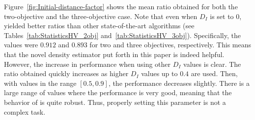 Figure~\ref{fig:Initial-distance-factor} shows the mean \HV{} ratio obtained for both the two-objective 
and the three-objective case.
%
Note that even when $D_I$ is set to $0$, \VSDMOEA{} yielded better \HV{} ratios than other 
state-of-the-art algorithms (see Tables~\ref{tab:StatisticsHV_2obj} and~\ref{tab:StatisticsHV_3obj}).
%
Specifically, the values were $0.912$ and $0.893$ for two and three objectives, respectively.
%
This means that the novel density estimator put forth in this paper is indeed helpful.
%
However, the increase in performance when using other $D_I$ values is clear.
%
The \HV{} ratio obtained quickly increases as higher $D_I$ values up to $0.4$ are used.
%
Then, with values in the range $[0.5, 0.9]$, the performance decreases slightly.
%
There is a large range of values where the performance is very good, meaning that 
the behavior of \VSDMOEA{} is quite robust.
%
Thus, properly setting this parameter is not a complex task.

